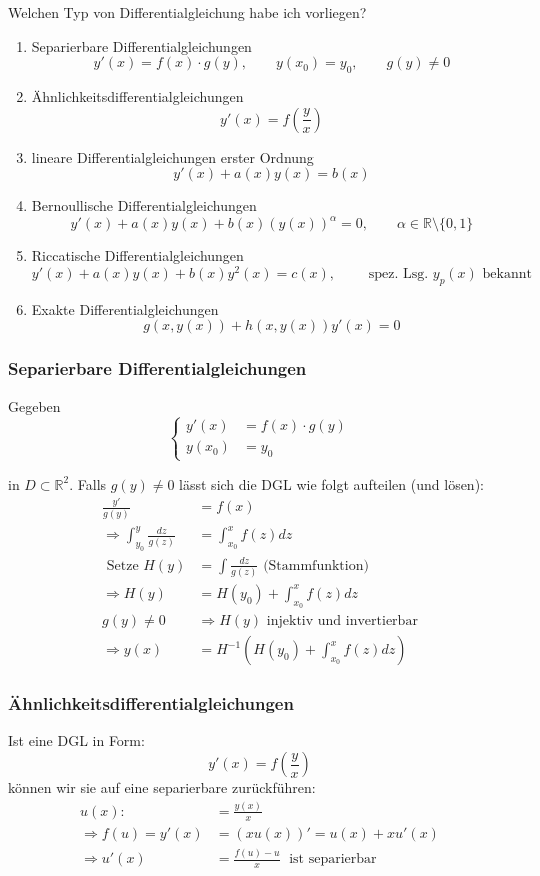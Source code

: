 \documentclass[a4paper]{article}
\newcommand{\R}{\mathbb{R}}
\begin{document}
Welchen Typ von Differentialgleichung habe ich vorliegen?
\begin{enumerate}
	\item Separierbare Differentialgleichungen
		\[
			y' (x) = f(x) \cdot g(y), \qquad
			y(x_0) = y_0, \qquad
			g(y) \neq 0
		\] 
	\item Ähnlichkeitsdifferentialgleichungen
		\[
			y' (x) = f \left(
				\frac{ y }{ x }
			\right) 
		\] 
	\item lineare Differentialgleichungen erster Ordnung
		\[
			y' (x) + a(x) y(x) = b(x)
		\] 
	\item Bernoullische Differentialgleichungen
		\[
			y' (x) + a(x) y(x) + b(x) (y(x)) ^{\alpha} = 0,
			\qquad \alpha \in \R \setminus \{
				0, 1
			\} 
		\] 
	\item Riccatische Differentialgleichungen
		\[
			y' (x) + a(x) y(x) + b(x) y ^2 (x) = c(x), \qquad
			\text{ spez. Lsg. } y_p (x) \text{ bekannt }
		\] 
	\item Exakte Differentialgleichungen
		\[
			g(x, y(x)) + h(x, y(x)) y' (x) = 0
		\] 
\end{enumerate}

\subsubsection{Separierbare Differentialgleichungen}
Gegeben
\[
\begin{cases}
	y' (x) & = f(x) \cdot g(y) \\
	y(x_0) &= y_0 
\end{cases}
\] 

in $D \subset \R ^2$. Falls $g(y) \neq 0$
lässt sich die DGL wie folgt aufteilen (und lösen):
\begin{align*}
	\frac{ y' }{ g(y) } &= f(x) \\
	\Rightarrow 
	\int_{y_0}^{y} \frac{ dz }{ g(z) } 
		&= 
		\int_{x_0}^{x} f(z) dz 
	\\
	\text{ Setze } H(y) 
		&= \int \frac{ dz }{ g(z) } 
		\text{ (Stammfunktion) } \\
		\Rightarrow H(y) 
		&= H(y_0)  + \int_{x_0}^{x} f(z) dz \\
		g(y) \neq 0 &\Rightarrow H(y)
		\text{ injektiv und invertierbar}
		\\
	\Rightarrow y(x)
	&= H ^{-1} \left(
		H(y_0) + \int_{x_0}^{x} f(z) dz
	\right)  
\end{align*}

\subsubsection{Ähnlichkeitsdifferentialgleichungen}
Ist eine DGL in Form:
\[
	y' (x) = f \left(
		\frac{ y }{ x }
	\right) 
\] 
können wir sie auf eine separierbare zurückführen:
\begin{align*}
	u(x) : &= \frac{ y(x) }{ x } \\
	\Rightarrow f(u) = y' (x)
	&= \left(
		x u(x)
	\right)' = u(x) + xu'(x) \\
	\Rightarrow u'(x) &= \frac{ f(u) - u }{ x }
	\; \text{ ist separierbar }
\end{align*}
\end{document}
